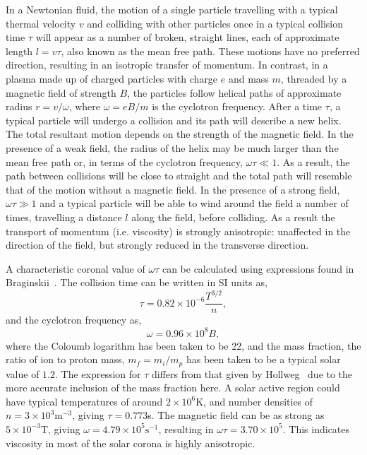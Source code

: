 In a Newtonian fluid, the motion of a single particle travelling with a typical thermal velocity $v$ and colliding with other particles once in a typical collision time $\tau$ will appear as a number of broken, straight lines, each of approximate length $l = v\tau$, also known as the mean free path. These motions have no preferred direction, resulting in an isotropic transfer of momentum. In contrast, in a plasma made up of charged particles with charge $e$ and mass $m$, threaded by a magnetic field of strength $B$, the particles follow helical paths of approximate radius $r = v/\omega$, where $\omega = eB/m$ is the cyclotron frequency. After a time $\tau$, a typical particle will undergo a collision and its path will describe a new helix. The total resultant motion depends on the strength of the magnetic field. In the presence of a weak field, the radius of the helix may be much larger than the mean free path or, in terms of the cyclotron frequency, $\omega \tau \ll 1$. As a result, the path between collisions will be close to straight and the total path will resemble that of the motion without a magnetic field. In the presence of a strong field, $\omega \tau \gg 1$ and a typical particle will be able to wind around the field a number of times, travelling a distance $l$ along the field, before colliding. As a result the transport of momentum (i.e. viscosity) is strongly anisotropic: unaffected in the direction of the field, but strongly reduced in the transverse direction.

A characteristic coronal value of $\omega \tau$ can be calculated using expressions found in Braginskii~\cite{braginskiiTransportProcessesPlasma1965}. The collision time can be written in SI units as,
\begin{equation}
  \label{eq:collision_time}
  \tau = 0.82 \times 10^{-6} \frac{T^{3/2}}{n},
\end{equation}
and the cyclotron frequency as,
\begin{equation}
  \label{eq:cyclotron_frequency}
  \omega = 0.96\times10^8 B,
\end{equation}
where the Coloumb logarithm has been taken to be 22, and the mass fraction, the ratio of ion to proton mass, $m_f = m_i/m_p$ has been taken to be a typical solar value of $1.2$. The expression for $\tau$ differs from that given by Hollweg~\cite{hollwegViscosityMagnetizedPlasma1985} due to the more accurate inclusion of the mass fraction here. A solar active region could have typical temperatures of around $2\times 10^6$K, and number densities of $n = 3 \times 10^3\text{m}^{-3}$, giving $\tau = 0.773$s. The magnetic field can be as strong as $5\times 10^{-3}$T, giving $\omega = 4.79 \times 10^5 \text{s}^{-1}$, resulting in $\omega \tau = 3.70 \times 10^5$. This indicates viscosity in most of the solar corona is highly anisotropic.

